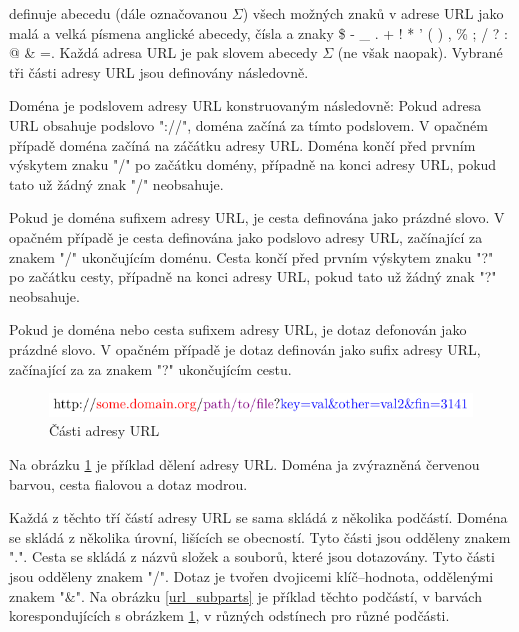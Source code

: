 \cite{berners-lee_uniform_1994} definuje abecedu (dále označovanou \( \Sigma \)) všech možných znaků v adrese URL jako malá a velká písmena anglické abecedy, čísla a znaky \$ - \_ . + ! * ' ( ) , \% ; / ? : @ \& =. Každá adresa URL je pak slovem abecedy \( \Sigma \) (ne však naopak). Vybrané tři části adresy URL jsou definovány následovně.
\begin{define}
	Doména je podslovem adresy URL konstruovaným následovně: Pokud adresa URL obsahuje podslovo "://", doména začíná za tímto podslovem. V opačném případě doména začíná na záčátku adresy URL. Doména končí před prvním výskytem znaku "/" po začátku domény, případně na konci adresy URL, pokud tato už žádný znak "/" neobsahuje.
\end{define}
\begin{define}
	Pokud je doména sufixem adresy URL, je cesta definována jako prázdné slovo. V opačném případě je cesta definována jako podslovo adresy URL, začínající za znakem "/" ukončujícím doménu. Cesta končí před prvním výskytem znaku "?" po začátku cesty, případně na konci adresy URL, pokud tato už žádný znak "?" neobsahuje.
\end{define}
\begin{define}
	Pokud je doména nebo cesta sufixem adresy URL, je dotaz defonován jako prázdné slovo. V opačném případě je dotaz definován jako sufix adresy URL, začínající za za znakem "?" ukončujícím cestu.
\end{define}

\begin{figure}[h]
	\caption{Části adresy URL}\label{url_parts}
	\centering
	\includegraphics{images/url_parts/url_parts.pdf}
\end{figure}

Na obrázku \ref{url_parts} je příklad dělení adresy URL. Doména ja zvýrazněná červenou barvou, cesta fialovou a dotaz modrou.

Každá z těchto tří částí adresy URL se sama skládá z několika podčástí. Doména se skládá z několika úrovní, lišících se obecností. Tyto části jsou odděleny znakem ".". Cesta se skládá z názvů složek a souborů, které jsou dotazovány. Tyto části jsou odděleny znakem "/". Dotaz je tvořen dvojicemi klíč--hodnota, oddělenými znakem "\&". Na obrázku \ref{url_subparts} je příklad těchto podčástí, v barvách korespondujících s obrázkem \ref{url_parts}, v různých odstínech pro různé podčásti.

